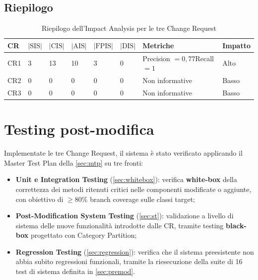 \documentclass[11pt,a4paper]{article}
\newcommand{\SIS}{\textrm{SIS}}
\newcommand{\CIS}{\textrm{CIS}}
\newcommand{\AIS}{\textrm{AIS}}
\newcommand{\FPIS}{\textrm{FPIS}}
\newcommand{\DIS}{\textrm{DIS}}
\newcommand{\thead}[1]{\textbf{#1}}
\begin{document}
\subsection{Riepilogo}
\label{sec:ia-riepilogo}

\begin{table}[H]
  \centering\small
  \caption{Riepilogo dell'Impact Analysis per le tre Change Request}
  \label{tab:ia-riepilogo}
  \begin{tabularx}{\linewidth}{@{}C{1.1cm} C{1.1cm} C{1.1cm} C{1.1cm} C{1.3cm} C{1.1cm} L{2.6cm} Y@{}}
    \toprule
    \thead{CR} & $|\SIS|$ & $|\CIS|$ & $|\AIS|$ & $|\FPIS|$ & $|\DIS|$ &
    \thead{Metriche} & \thead{Impatto}\\
    \midrule
    CR1 & 3 & 13 & 10 & 3 & 0 &
      Precision $= 0{,}77$\newline Recall $= 1$ & Alto\\
    CR2 & 0 & 0 & 0 & 0 & 0 &
      Non informative & Basso\\
    CR3 & 0 & 0 & 0 & 0 & 0 &
      Non informative & Basso\\
    \bottomrule
  \end{tabularx}
\end{table}

\section{Testing post-modifica}
\label{sec:postmod}

Implementate le tre Change Request, il sistema \`e stato verificato applicando
il Master Test Plan della \cref{sec:mtp} su tre fronti:

\begin{itemize}
  \item \textbf{Unit e Integration Testing} (\cref{sec:whitebox}): verifica
    \textbf{white-box} della correttezza dei metodi ritenuti critici nelle
    componenti modificate o aggiunte, con obiettivo di $\geq 80\%$ branch
    coverage sulle classi target;
  \item \textbf{Post-Modification System Testing} (\cref{sec:st}): validazione a
    livello di sistema delle nuove funzionalit\`a introdotte dalle CR, tramite
    testing \textbf{black-box} progettato con Category Partition;
  \item \textbf{Regression Testing} (\cref{sec:regression}): verifica che il
    sistema preesistente non abbia subito regressioni funzionali, tramite la
    riesecuzione della suite di 16 test di sistema definita in
    \cref{sec:premod}.
\end{itemize}
\end{document}
